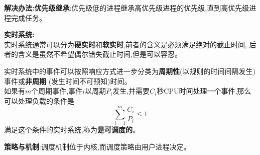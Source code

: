 \documentclass[UTF8,a4paper]{ctexart}
\newcommand{\spaceline}{\vspace{\baselineskip}}
\begin{document}
    \textbf{解决办法:优先级继承}:优先级低的进程继承高优先级进程的优先级,直到高优先级进程完成任务。

    \spaceline
    \textbf{实时系统:}\\
    实时系统通常可以分为\textbf{硬实时}和\textbf{软实时},前者的含义是必须满足绝对的截止时间,
    后者的含义是虽然不希望偶尔错失截止时间,但是可以容忍。

    \spaceline
    实时系统中的事件可以按照响应方式进一步分类为\textbf{周期性}(以规则的时间间隔发生)事件或\textbf{非周期}
    (发生时间不可预知)时间。\\
    如果有$m$个周期事件,事件$i$以周期$P_i$发生,并需要$C_i$秒CPU时间处理一个事件,那么可以处理负载的条件是
    \[\sum_{i = 1}^m \frac{C_i}{P_i} \leq 1\]
    满足这个条件的实时系统,称为\textbf{是可调度的}。

    \spaceline
    \textbf{策略与机制}:调度机制位于内核,而调度策略由用户进程决定。
\end{document}
